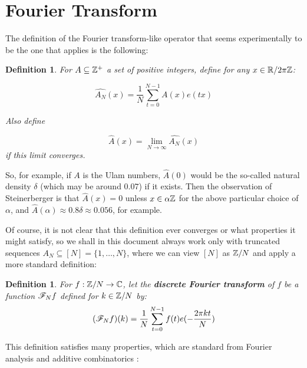 \documentclass{report}
\newtheorem{definition}[theorem]{Definition}
\theoremstyle{remark}
\numberwithin{equation}{section}
\begin{document}
\section{Fourier Transform}

The definition of the Fourier transform-like operator that seems
experimentally to be the one that applies is the following:

\begin{definition}\label{def:fourier}
For $A \subseteq \mathbb{Z}^+$ a set of positive integers, define for any
$x\in \mathbb{R}/2\pi\mathbb{Z}$: 

\[\widehat{A_N}(x) = \frac{1}{N} \sum_{t=0}^{N-1} A(x) e(tx)\]

Also define

\[\widehat{A}(x) = \lim_{N \to \infty} \widehat{A_N}(x)\]
if this limit converges.  
\end{definition}

So, for example, if $A$ is the Ulam numbers, $\widehat{A}(0)$ would be
the so-called natural density $\delta$ (which may be around $0.07$) if
it exists.  Then the observation of Steinerberger is that
$\widehat{A}(x) = 0$ unless $x \in \alpha\mathbb{Z}$ for the above particular
choice of $\alpha$, and
$\widehat{A}(\alpha) \approx 0.8\delta \approx 0.056$, for example.

Of course, it is not clear that this definition ever converges or what
properties it might satisfy, so we shall in this document always work
only with truncated sequences $A_N \subseteq [N] = \{1, \ldots, N\}$,
where we can view $[N]$ as $\mathbb{Z}/N$ and apply a more standard
definition:

\begin{definition}
  For $f : \mathbb{Z}/N \to \mathbb{C}$, let the \textbf{discrete Fourier transform}
  of $f$ be a function $\mathscr{F}_N f$ defined for $k \in \mathbb{Z}/N$ by:
  \[(\mathscr{F}_N f)(k) = \frac{1}{N} \sum_{t=0}^{N-1} f(t) e(-\frac{2\pi k t}{N})\]
\end{definition}

This definition satisfies many properties, which are standard from
Fourier analysis and additive combinatorics \cite{tao:cup2006}:
\end{document}
